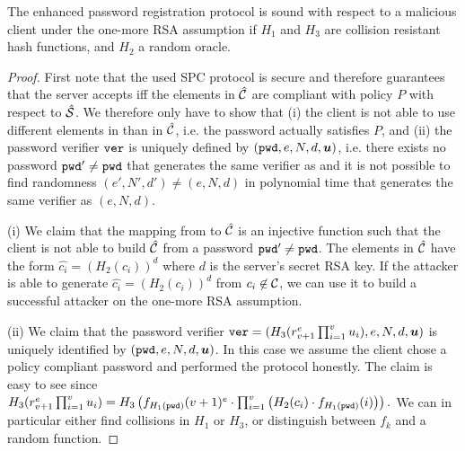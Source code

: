 \begin{lemma}[Soundness]\label{lem:soundness}
 The enhanced password registration protocol is sound with respect to a malicious client under the one-more RSA assumption if $H_1$ and $H_3$ are collision resistant hash functions, and $H_2$ a random oracle.
\end{lemma}

\begin{proof}
  First note that the used SPC protocol is secure and therefore guarantees that the server accepts iff the elements in $\hat{\mathcal{C}}$ are compliant with policy $P$ with respect to $\hat{\mathcal{S}}$.
  We therefore only have to show that (i) the client is not able to use different elements in \cC than in $\hat{\mathcal{C}}$, i.e. the password \pwd actually satisfies $P$, and (ii) the password verifier $\mathtt{ver}$ is uniquely defined by $(\mathtt{pwd}, e, N, d, \bm{u})$, i.e. there exists no password $\mathtt{pwd}'\not=\mathtt{pwd}$ that generates the same verifier as \pwd and it is not possible to find randomness $(e',N', d')\not=(e, N, d)$ in polynomial time that generates the same verifier as $(e,N, d)$.
  
  (i) We claim that the mapping from \cC to $\hat{\mathcal{C}}$ is an injective function such that the client is not able to build $\hat{\mathcal{C}}$ from a password $\mathtt{pwd}'\not=\mathtt{pwd}$.
  The elements in $\hat{\mathcal{C}}$ have the form $\hat{c_i}=(H_2(c_i))^d$ where $d$ is the server's secret RSA key.
  If the attacker is able to generate $\hat{c_i}=(H_2(c_i))^d$ from $c_i\not\in\mathcal{C}$, we can use it to build a successful attacker on the one-more RSA assumption.
  
  (ii) We claim that the password verifier $\mathtt{ver}=(H_3(r_{v+1}^e\prod_{i=1}^{v} u_i), e, N, d, \bm{u})$ is uniquely identified by $(\mathtt{pwd}, e, N, d, \bm{u})$.
  In this case we assume the client chose a policy compliant password \pwd and performed the protocol honestly.
  The claim is easy to see since 
  $
    H_3(r_{v+1}^e\prod_{i=1}^{v} u_i) = 
    H_3\left(f_{H_1(\mathtt{pwd})}(v+1)^e \cdot \prod_{i=1}^{v} \left(H_2(c_i)\cdot f_{H_1(\mathtt{pwd})}(i)\right)\right).
  $
  We can in particular either find collisions in $H_1$ or $H_3$, or distinguish between $f_k$ and a random function.
\end{proof}
